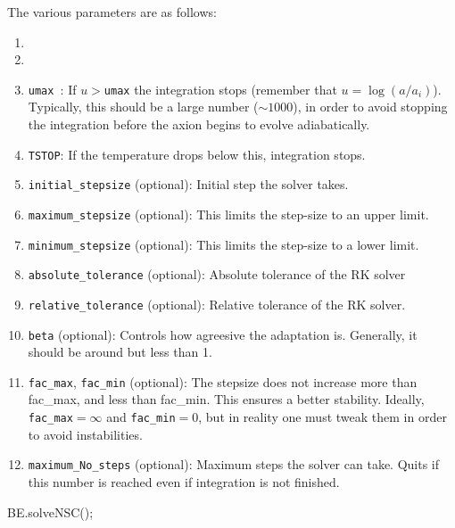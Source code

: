 \documentclass[11pt,a4paper]{article}
\begin{document}
The various parameters are as follows:
%
\begin{enumerate}
	\item 
	\item 
	\item {\tt umax }: If $u>${\tt umax} the integration stops (remember that $u=\log(a/a_i)$). Typically, this should be a large number ($\sim 1000$), in order to avoid stopping the integration before the axion begins to evolve  adiabatically.    
	\item {\tt TSTOP}: If the temperature drops below this, integration stops. 
	
	\item {\tt initial\_stepsize} (optional): Initial step the solver takes. 
	
	\item {\tt maximum\_stepsize} (optional): This limits the step-size to an upper limit. 
	\item {\tt minimum\_stepsize} (optional): This limits the step-size to a lower limit. 
	
	\item {\tt absolute\_tolerance} (optional): Absolute tolerance of the RK solver
	
	\item {\tt relative\_tolerance} (optional): Relative tolerance of the RK solver.
	
	\item {\tt beta} (optional): Controls how agreesive the adaptation is. Generally, it should be around but less than 1.
	
	\item {\tt fac\_max},  {\tt fac\_min} (optional): The stepsize does not increase more than fac\_max, and less than fac\_min. 
	This ensures a better stability. Ideally, {\tt fac\_max}$=\infty$ and {\tt fac\_min}$=0$, but in reality one must 
	tweak them in order to avoid instabilities.
	
	\item {\tt maximum\_No\_steps} (optional): Maximum steps the solver can take. Quits if this number is reached even if integration
	is not finished. 
\end{enumerate}

%
\begin{cpp}
	BE.solveNSC();
\end{cpp}
\end{document}
